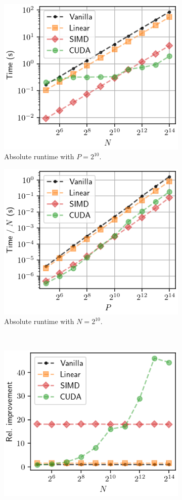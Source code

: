 \begin{figure}[htbp]
    \centering
    \begin{subfigure}{.49\textwidth}
        \includegraphics[width=.8\textwidth]{img/laptop/abs_performance-N.png}
        \caption{Absolute runtime with $P = 2^{10}$.}
    \end{subfigure}
    \begin{subfigure}{.49\textwidth}
        \includegraphics[width=.8\textwidth]{img/laptop/abs_performance-pP.png}
        \caption{Absolute runtime with $N = 2^{10}$.}
    \end{subfigure}\\
    \begin{subfigure}{.49\textwidth}
        \includegraphics[width=.8\textwidth]{img/laptop/rel_performance-N.png}

\end{subfigure}
\end{figure}
